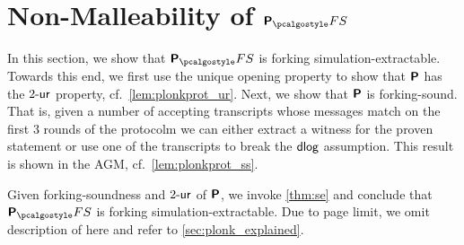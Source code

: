 

\section{Non-Malleability of $\plonkprotfs$} 
\label{sec:plonk}
In this section, we show that $\plonkprotfs$ is forking simulation-extractable. Towards this end, we first use the unique opening property to show that
$\bm{\mathsf{P}}$ has the ${2\text{-}\mathsf{ur}}$ property,
cf.~\cref{lem:plonkprot_ur}.
Next, we show that $\bm{\mathsf{P}}$ is forking-sound. That is, given a
number of accepting transcripts whose messages match on the first $3$ rounds of the
protocolm we can either extract a witness for the proven statement or use
one of the transcripts to break the $\mathsf{dlog}$ assumption. This result is shown in
the AGM, cf.~\cref{lem:plonkprot_ss}.


Given forking-soundness and ${2\text{-}\mathsf{ur}}$ of $\bm{\mathsf{P}}$, we invoke \cref{thm:se} and conclude that $\plonkprot_\fs$ is forking simulation-extractable.
Due to page limit, we omit description of \plonk{} here and refer to
\cref{sec:plonk_explained}. 

 
